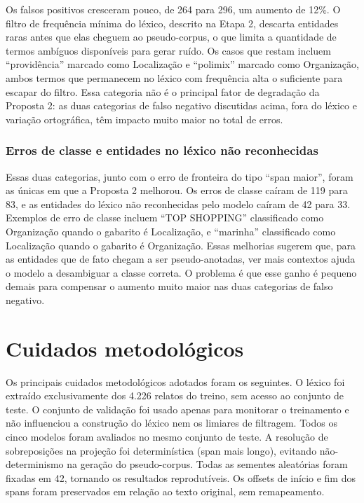 \documentclass[12pt,a4paper]{article}
\begin{document}
Os falsos positivos cresceram pouco, de 264 para 296, um aumento de 12\%. O
filtro de frequência mínima do léxico, descrito na Etapa 2, descarta
entidades raras antes que elas cheguem ao pseudo-corpus, o que limita a
quantidade de termos ambíguos disponíveis para gerar ruído. Os casos que
restam incluem ``providência'' marcado como Localização e ``polimix''
marcado como Organização, ambos termos que permanecem no léxico com
frequência alta o suficiente para escapar do filtro. Essa categoria não é o
principal fator de degradação da Proposta 2: as duas categorias de falso
negativo discutidas acima, fora do léxico e variação ortográfica, têm impacto
muito maior no total de erros.

\subsubsection{Erros de classe e entidades no léxico não reconhecidas}

Essas duas categorias, junto com o erro de fronteira do tipo ``span maior'',
foram as únicas em que a Proposta 2 melhorou. Os erros de classe caíram de
119 para 83, e as entidades do léxico não reconhecidas pelo modelo caíram de
42 para 33. Exemplos de erro de classe incluem ``TOP SHOPPING'' classificado
como Organização quando o gabarito é Localização, e ``marinha'' classificado
como Localização quando o gabarito é Organização. Essas melhorias sugerem que,
para as entidades que de fato chegam a ser pseudo-anotadas, ver mais contextos
ajuda o modelo a desambiguar a classe correta. O problema é que esse ganho é
pequeno demais para compensar o aumento muito maior nas duas categorias de
falso negativo.

\section{Cuidados metodológicos}

Os principais cuidados metodológicos adotados foram os seguintes. O léxico foi
extraído exclusivamente dos 4.226 relatos do treino, sem acesso ao conjunto de
teste. O conjunto de validação foi usado apenas para monitorar o treinamento e
não influenciou a construção do léxico nem os limiares de filtragem. Todos os
cinco modelos foram avaliados no mesmo conjunto de teste. A resolução de sobreposições
na projeção foi determinística (span mais longo), evitando não-determinismo
na geração do pseudo-corpus. Todas as sementes aleatórias foram fixadas em 42,
tornando os resultados reprodutíveis. Os offsets de início e fim dos spans foram
preservados em relação ao texto original, sem remapeamento.
\end{document}
